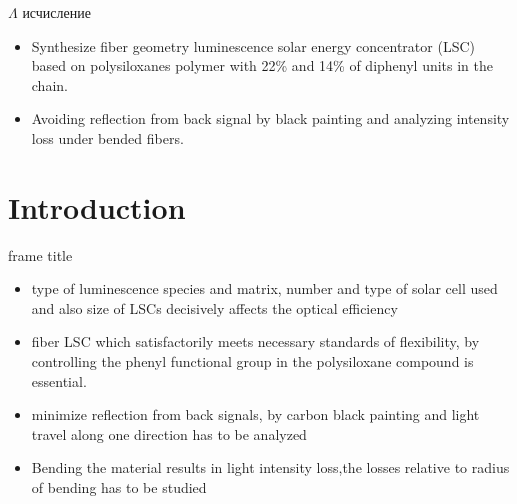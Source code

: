 \documentclass{beamer}
\begin{document}
\begin{frame}{$\Lambda$ исчисление}
\begin{itemize}
\item Synthesize fiber geometry luminescence solar energy concentrator (LSC) based on polysiloxanes polymer with 22\% and 14\% of diphenyl units in the chain.

\item Avoiding reflection from back signal by black painting and analyzing intensity loss under bended fibers.

\end{itemize}
\end{frame}
% 
% 
% 
% 
% 



\section{Introduction}
\begin{frame}{frame title}
\newpage
\begin{itemize}
\item{type of luminescence species and matrix, number and type of solar cell used and also size of LSCs decisively affects the optical efficiency
}
\item{fiber LSC which satisfactorily meets necessary standards of flexibility, by controlling the phenyl functional group in the polysiloxane compound is essential.
}
\item{minimize reflection from back signals, by carbon black painting and light travel along one direction has to be analyzed }
\item{Bending the material results in light intensity loss,the losses relative to radius of bending has to be studied }

\end{itemize}
\end{frame}
\end{document}
